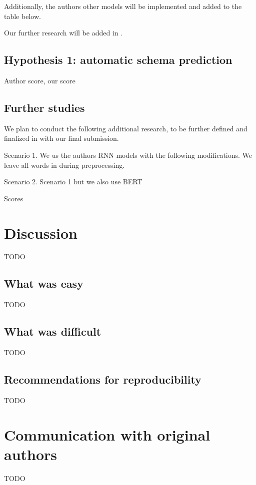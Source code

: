 \documentclass[11pt,a4paper]{article}
\begin{document}
Additionally, the authors other models will be implemented and added to the table below. 

Our further research will be added in . 

\subsection{Hypothesis 1: automatic schema prediction}

Author score, our score 

\subsection{Further studies}
\label{further_studies}

We plan to conduct the following additional research, to be further defined and finalized in with our final submission. 

Scenario 1. We us the authors RNN models with the following modifications. We leave all words in during preprocessing. 

Scenario 2. Scenario 1 but we also use BERT 

Scores

\section{Discussion}
TODO
\subsection{What was easy}
TODO
\subsection{What was difficult}
TODO
\subsection{Recommendations for reproducibility}
TODO
\section{Communication with original authors}
TODO



\end{document}

